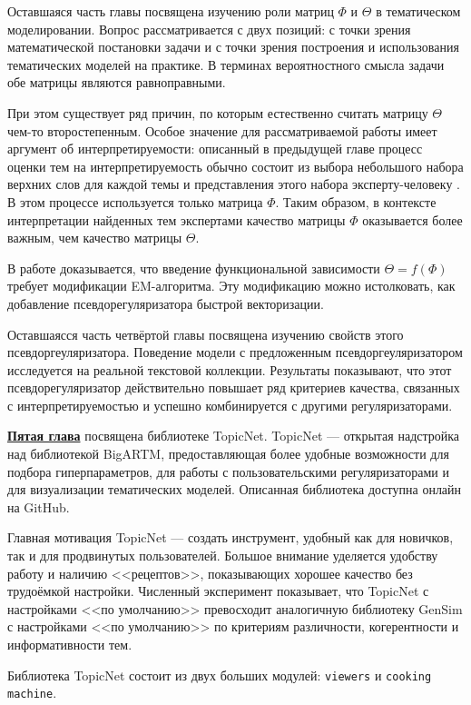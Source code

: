 Оставшаяся часть главы посвящена изучению роли матриц $\Phi$ и $\Theta$ в тематическом моделировании. Вопрос рассматривается с двух позиций: с точки зрения математической постановки задачи и с точки зрения построения и использования тематических моделей на практике. В терминах вероятностного смысла задачи обе матрицы являются равноправными.

При этом существует ряд причин, по которым естественно считать матрицу $\Theta$ чем-то второстепенным. Особое значение для рассматриваемой работы имеет аргумент об интерпретируемости: описанный в предыдущей главе процесс оценки тем на интерпретируемость обычно состоит из выбора небольшого набора верхних слов для каждой темы и представления этого набора эксперту-человеку \cite{roder2015exploring}. В этом процессе используется только матрица $\Phi$. Таким образом, в контексте интерпретации найденных тем экспертами качество матрицы $\Phi$ оказывается более важным, чем качество матрицы $\Theta$.

В работе \cite{thetaless} доказывается, что введение функциональной зависимости $\Theta = f(\Phi)$ требует модификации EM-алгоритма. Эту модификацию можно истолковать, как добавление псевдорегуляризатора быстрой векторизации.

Оставшаясся часть четвёртой главы посвящена изучению свойств этого псевдоргеуляризатора. Поведение модели с предложенным псевдоргеуляризатором исследуется на реальной текстовой коллекции. Результаты показывают, что этот псевдорегуляризатор действительно повышает ряд критериев качества, связанных с интерпретируемостью и успешно комбинируется с другими регуляризаторами.

\underline{\textbf{Пятая глава}} посвящена библиотеке TopicNet. TopicNet --- открытая надстройка над библиотекой BigARTM, предоставляющая более удобные
возможности для подбора гиперпараметров, для работы с пользовательскими
регуляризаторами и для визуализации тематических моделей. Описанная библиотека доступна онлайн на GitHub.

Главная мотивация TopicNet --- создать инструмент, удобный как для новичков, так и для продвинутых пользователей. Большое внимание уделяется удобству работу и наличию <<рецептов>>, показывающих хорошее качество без трудоёмкой настройки. Численный эксперимент показывает, что TopicNet с настройками <<по умолчанию>> превосходит аналогичную библиотеку GenSim с настройками <<по умолчанию>> по критериям различности, когерентности и информативности тем.

Библиотека TopicNet состоит из двух больших модулей: \texttt{viewers} и \texttt{cooking machine}.  

